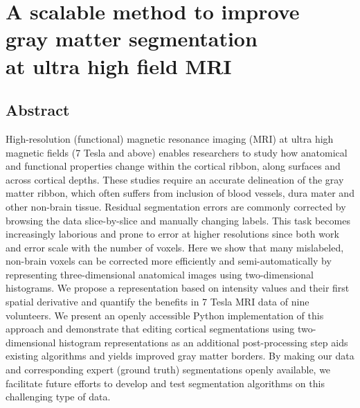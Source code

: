 \chapter[A scalable method to improve gray matter segmentation at ultra high field MRI]{A scalable method to improve\\ gray matter segmentation\\ at ultra high field MRI}

\clearpage{\thispagestyle{empty}\cleardoublepage}

\section{Abstract}
High-resolution (functional) magnetic resonance imaging (MRI) at ultra high magnetic fields (7 Tesla and above) enables researchers to study how anatomical and functional properties change within the cortical ribbon, along surfaces and across cortical depths. These studies require an accurate delineation of the gray matter ribbon, which often suffers from inclusion of blood vessels, dura mater and other non-brain tissue. Residual segmentation errors are commonly corrected by browsing the data slice-by-slice and manually changing labels. This task becomes increasingly laborious and prone to error at higher resolutions since both work and error scale with the number of voxels. Here we show that many mislabeled, non-brain voxels can be corrected more efficiently and semi-automatically by representing three-dimensional anatomical images using two-dimensional histograms. We propose a representation based on intensity values and their first spatial derivative and quantify the benefits in 7 Tesla MRI data of nine volunteers. We present an openly accessible Python implementation of this approach and demonstrate that editing cortical segmentations using two-dimensional histogram representations as an additional post-processing step aids existing algorithms and yields improved gray matter borders. By making our data and corresponding expert (ground truth) segmentations openly available, we facilitate future efforts to develop and test segmentation algorithms on this challenging type of data.


